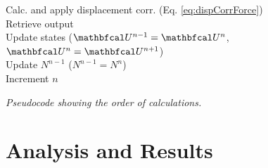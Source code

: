 \begin{algorithm}[ht]
{{{\begin{minipage}[c]{0.9\linewidth}
                Calc. and apply displacement corr. (Eq. \eqref{eq:dispCorrForce})\\
                Retrieve output\\
                Update states ($\U^{n-1} = \U^n$, $\U^n = \U^{n+1}$)\\
                Update $N^{n-1}$ ($N^{n-1} = N^n$)\\
                Increment $n$
            \end{minipage} 
            

            }
        }
    }
    \vspace{0.12cm}
    \caption{\it Pseudocode showing the order of calculations.\label{alg:calcOrder}}
\end{algorithm}

\section{Analysis and Results}\label{sec:results}

